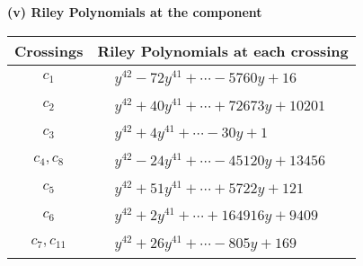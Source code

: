 \documentclass[1p]{elsarticle_modified}
\theoremstyle{definition}
\begin{document}
\newpage\renewcommand{\arraystretch}{1}
\flushleft \textbf{(v) Riley Polynomials at the component}\newline \\
\begin{tabular}{m{50pt}|m{274pt}}
Crossings & \hspace{64pt}Riley Polynomials at each crossing \\
\hline $$\begin{aligned}c_{1}\end{aligned}$$&$\begin{aligned}
&y^{42}-72 y^{41}+\cdots-5760 y+16
\end{aligned}$\\
\hline $$\begin{aligned}c_{2}\end{aligned}$$&$\begin{aligned}
&y^{42}+40 y^{41}+\cdots+72673 y+10201
\end{aligned}$\\
\hline $$\begin{aligned}c_{3}\end{aligned}$$&$\begin{aligned}
&y^{42}+4 y^{41}+\cdots-30 y+1
\end{aligned}$\\
\hline $$\begin{aligned}c_{4},c_{8}\end{aligned}$$&$\begin{aligned}
&y^{42}-24 y^{41}+\cdots-45120 y+13456
\end{aligned}$\\
\hline $$\begin{aligned}c_{5}\end{aligned}$$&$\begin{aligned}
&y^{42}+51 y^{41}+\cdots+5722 y+121
\end{aligned}$\\
\hline $$\begin{aligned}c_{6}\end{aligned}$$&$\begin{aligned}
&y^{42}+2 y^{41}+\cdots+164916 y+9409
\end{aligned}$\\
\hline $$\begin{aligned}c_{7},c_{11}\end{aligned}$$&$\begin{aligned}
&y^{42}+26 y^{41}+\cdots-805 y+169
\end{aligned}$\\

\end{tabular}
\end{document}
